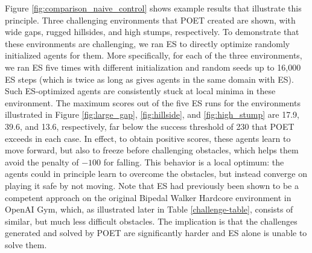 \documentclass{article}
\newcommand{\jc}[1]{\comments{\textcolor{deepForestGreen}{[JC: #1]}}}
\newcommand{\jl}[1]{\comments{\textcolor{magenta}{[Joel: #1]}}}
\newcommand{\ks}[1]{\comments{\textcolor{purple}{[Ken: #1]}}}
\newcommand{\rw}[1]{\comments{\textcolor{blue}{[Rui: #1]}}}
\newcommand{\comments}[1]{#1}
\begin{document}
Figure \ref{fig:comparison_naive_control} shows example results that illustrate this principle.  Three challenging environments that POET created are shown, with wide gaps, rugged hillsides, and high stumps, respectively. To demonstrate that these environments are challenging, we ran ES to directly optimize randomly initialized agents for them. More specifically, for each of the three environments, we ran ES five times with different initialization and random seeds up to 16,000 ES steps (which is twice as long as \citet{davidha:arxiv18} gives agents in the same domain with ES). Such ES-optimized agents are consistently stuck 
at local minima in these environment. 
The maximum scores out of the five ES runs for the environments illustrated in Figure \ref{fig:large_gap}, \ref{fig:hillside}, and \ref{fig:high_stump} are 17.9, 39.6, and 13.6, respectively, far below the success threshold of 230 that POET exceeds in each case.  
In effect, to obtain positive scores, these agents learn to move forward, but also to freeze before challenging obstacles, which helps them avoid the penalty of $-100$ for falling.  This behavior is a local optimum: the agents could in principle learn to 
overcome the obstacles, but instead converge on playing it safe by not moving.
Note that ES had previously been shown to be a competent approach \cite{dha_esblog} on the original Bipedal Walker Hardcore environment in OpenAI Gym, which, as illustrated later in Table \ref{challenge-table}, consists of similar, but much less difficult obstacles.
The implication is that the challenges generated and solved by POET are significantly harder and ES alone is unable to solve them.
\end{document}
